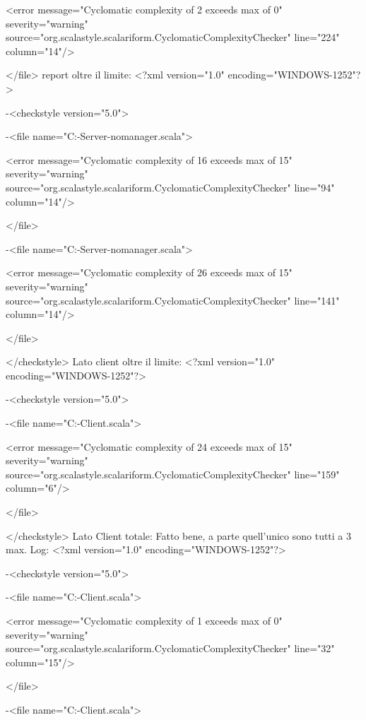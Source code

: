 \documentclass{scalatekids-article}
\begin{document}
<error message="Cyclomatic complexity of 2 exceeds max of 0" severity="warning" source="org.scalastyle.scalariform.CyclomaticComplexityChecker" line="224" column="14"/>

</file>
report oltre il limite:
<?xml version="1.0" encoding="WINDOWS-1252"?>

-<checkstyle version="5.0">


-<file name="C:\Users\Davide\Desktop\Actorbase-Server-nomanager\src\main\scala\com\actorbase\actorsystem\storefinder\Storefinder.scala">

<error message="Cyclomatic complexity of 16 exceeds max of 15" severity="warning" source="org.scalastyle.scalariform.CyclomaticComplexityChecker" line="94" column="14"/>

</file>


-<file name="C:\Users\Davide\Desktop\Actorbase-Server-nomanager\src\main\scala\com\actorbase\actorsystem\main\Main.scala">

<error message="Cyclomatic complexity of 26 exceeds max of 15" severity="warning" source="org.scalastyle.scalariform.CyclomaticComplexityChecker" line="141" column="14"/>

</file>

</checkstyle>
Lato client oltre il limite:
<?xml version="1.0" encoding="WINDOWS-1252"?>

-<checkstyle version="5.0">


-<file name="C:\Users\Davide\Documents\GitHub\Actorbase-Client\src\main\scala\com\actorbase\cli\controllers\GrammarParser.scala">

<error message="Cyclomatic complexity of 24 exceeds max of 15" severity="warning" source="org.scalastyle.scalariform.CyclomaticComplexityChecker" line="159" column="6"/>

</file>

</checkstyle>
Lato Client totale:
Fatto bene, a parte quell'unico sono tutti a 3 max. Log:
<?xml version="1.0" encoding="WINDOWS-1252"?>

-<checkstyle version="5.0">


-<file name="C:\Users\Davide\Documents\GitHub\Actorbase-Client\src\main\scala\com\actorbase\cli\models\AddCollaboratorCommand.scala">

<error message="Cyclomatic complexity of 1 exceeds max of 0" severity="warning" source="org.scalastyle.scalariform.CyclomaticComplexityChecker" line="32" column="15"/>

</file>


-<file name="C:\Users\Davide\Documents\GitHub\Actorbase-Client\src\main\scala\com\actorbase\cli\models\LogoutCommand.scala">
\end{document}
